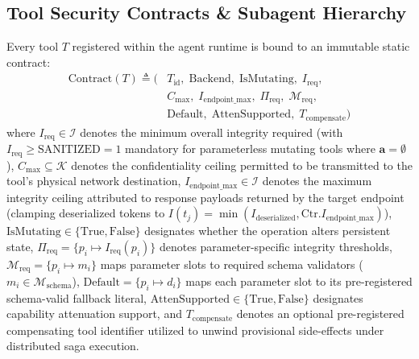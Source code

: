 \documentclass[conference,10pt]{IEEEtran}
\begin{document}
\subsection{Tool Security Contracts \& Subagent Hierarchy}
Every tool $T$ registered within the agent runtime is bound to an immutable static contract:
\begin{equation}
\begin{split}
\text{Contract}(T) \triangleq \big( &T_{\text{id}}, \; \text{Backend}, \; \text{IsMutating}, \; I_{\text{req}}, \\
&C_{\text{max}}, \; I_{\text{endpoint\_max}}, \; \Pi_{\text{req}}, \; \mathcal{M}_{\text{req}}, \\
&\text{Default}, \; \text{AttenSupported}, \; T_{\text{compensate}} \big)
\end{split}
\end{equation}
where $I_{\text{req}} \in \mathcal{I}$ denotes the minimum overall integrity required (with $I_{\text{req}} \ge \text{SANITIZED} = 1$ mandatory for parameterless mutating tools where $\mathbf{a} = \emptyset$), $C_{\text{max}} \subseteq \mathcal{K}$ denotes the confidentiality ceiling permitted to be transmitted to the tool's physical network destination, $I_{\text{endpoint\_max}} \in \mathcal{I}$ denotes the maximum integrity ceiling attributed to response payloads returned by the target endpoint (clamping deserialized tokens to $I(t_j) = \min(I_{\text{deserialized}}, \text{Ctr}.I_{\text{endpoint\_max}})$), $\text{IsMutating} \in \{\text{True}, \text{False}\}$ designates whether the operation alters persistent state, $\Pi_{\text{req}} = \{p_i \mapsto I_{\text{req}}(p_i)\}$ denotes parameter-specific integrity thresholds, $\mathcal{M}_{\text{req}} = \{p_i \mapsto m_i\}$ maps parameter slots to required schema validators ($m_i \in \mathcal{M}_{\text{schema}}$), $\text{Default} = \{p_i \mapsto d_i\}$ maps each parameter slot to its pre-registered schema-valid fallback literal, $\text{AttenSupported} \in \{\text{True}, \text{False}\}$ designates capability attenuation support, and $T_{\text{compensate}}$ denotes an optional pre-registered compensating tool identifier utilized to unwind provisional side-effects under distributed saga execution.
\end{document}
